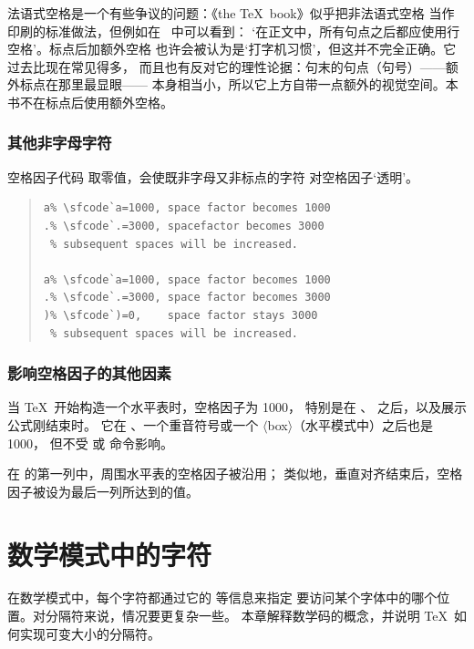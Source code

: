 \documentclass[a4paper]{rapport3}
\def\gr#1{$\langle$#1$\rangle$}\def\key#1{{\tt#1}}
\def\TeXbook{the \TeX\ book}\def\web{{\sc web}}
\newenvironment{example}{\begin{quotation}}{\end{quotation}}
\begin{document}
法语式空格是一个有些争议的问题：《\TeXbook》似乎把非法语式空格
当作印刷的标准做法，但例如在~\cite{Hart} 中可以看到：
`在正文中，所有句点之后都应使用行空格'。标点后加额外空格
也许会被认为是`打字机习惯'，但这并不完全正确。它过去比现在常见得多，
而且也有反对它的理性论据：句末的句点（句号）——额外标点在那里最显眼——
本身相当小，所以它上方自带一点额外的视觉空间。本书不在标点后使用额外空格。

\subsection{其他非字母字符}
\label{sec:sf-through-paren}

空格因子代码 取零值，会使既非字母又非标点的字符
对空格因子`透明'。

\begin{example}\begin{verbatim}
a% \sfcode`a=1000, space factor becomes 1000
.% \sfcode`.=3000, spacefactor becomes 3000
 % subsequent spaces will be increased.

a% \sfcode`a=1000, space factor becomes 1000
.% \sfcode`.=3000, space factor becomes 3000
)% \sfcode`)=0,    space factor stays 3000
 % subsequent spaces will be increased.
\end{verbatim}
\end{example}

\subsection{影响空格因子的其他因素}

当 \TeX\ 开始构造一个水平表时，空格因子为 1000，
特别是在 、 之后，以及展示公式刚结束时。
它在 、一个重音符号或一个 \gr{box}（水平模式中）之后也是 1000，
但不受  或  命令影响。

在  的第一列中，周围水平表的空格因子被沿用；
类似地，垂直对齐结束后，空格因子被设为最后一列所达到的值。


\endofchapter
\chapter{数学模式中的字符}\label{mathchar}

在数学模式中，每个字符都通过它的  等信息来指定
要访问某个字体中的哪个位置。对分隔符来说，情况要更复杂一些。
本章解释数学码的概念，并说明 \TeX\ 如何实现可变大小的分隔符。
 
\end{document}
